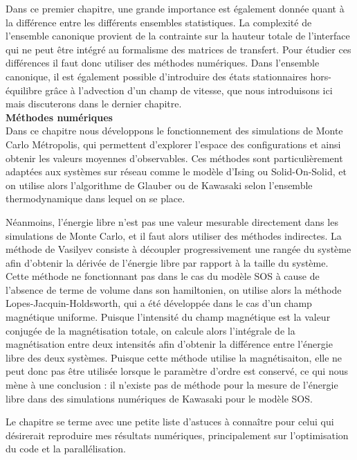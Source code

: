 Dans ce premier chapitre, une grande importance est également donnée quant à la différence entre les différents ensembles statistiques. La complexité de l'ensemble canonique provient de la contrainte sur la hauteur totale de l'interface qui ne peut être intégré au formalisme des matrices de transfert. Pour étudier ces différences il faut donc utiliser des méthodes numériques. Dans l'ensemble canonique, il est également possible d'introduire des états stationnaires hors-équilibre grâce à l'advection d'un champ de vitesse, que nous introduisons ici mais discuterons dans le dernier chapitre.\\

{\bf \large Méthodes numériques} \\

Dans ce chapitre nous développons le fonctionnement des simulations de Monte Carlo Métropolis, qui permettent d'explorer l'espace des configurations et ainsi obtenir les valeurs moyennes d'observables. Ces méthodes sont particulièrement adaptées aux systèmes sur réseau comme le modèle d'Ising ou Solid-On-Solid, et on utilise alors l'algorithme de Glauber ou de Kawasaki selon l'ensemble thermodynamique dans lequel on se place. 

Néanmoins, l'énergie libre n'est pas une valeur mesurable directement dans les simulations de Monte Carlo, et il faut alors utiliser des méthodes indirectes. La méthode de Vasilyev consiste à découpler progressivement une rangée du système afin d'obtenir la dérivée de l'énergie libre par rapport à la taille du système. Cette méthode ne fonctionnant pas dans le cas du modèle SOS à cause de l'absence de terme de volume dans son hamiltonien, on utilise alors la méthode Lopes-Jacquin-Holdsworth, qui a été développée dans le cas d'un champ magnétique uniforme. Puisque l'intensité du champ magnétique est la valeur conjugée de la magnétisation totale, on calcule alors l'intégrale de la magnétisation entre deux intensités afin d'obtenir la différence entre l'énergie libre des deux systèmes. Puisque cette méthode utilise la magnétisaiton, elle ne peut donc pas être utilisée lorsque le paramètre d'ordre est conservé, ce qui nous mène à une conclusion : il n'existe pas de méthode pour la mesure de l'énergie libre dans des simulations numériques de Kawasaki pour le modèle SOS.

Le chapitre se terme avec une petite liste d'astuces à connaître pour celui qui désirerait reproduire mes résultats numériques, principalement sur l'optimisation du code et la parallélisation.\\

